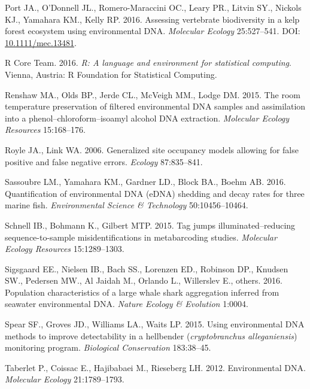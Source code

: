 \documentclass[fleqn,10pt,lineno]{wlpeerj} %
\begin{document}
\hypertarget{ref-MEC:MEC13481}{}
Port JA., O'Donnell JL., Romero-Maraccini OC., Leary PR., Litvin SY.,
Nickols KJ., Yamahara KM., Kelly RP. 2016. Assessing vertebrate
biodiversity in a kelp forest ecosystem using environmental DNA.
\emph{Molecular Ecology} 25:527--541. DOI:
\href{https://doi.org/10.1111/mec.13481}{10.1111/mec.13481}.

\hypertarget{ref-RcoreTeam}{}
R Core Team. 2016. \emph{R: A language and environment for statistical
computing}. Vienna, Austria: R Foundation for Statistical Computing.

\hypertarget{ref-renshaw2015room}{}
Renshaw MA., Olds BP., Jerde CL., McVeigh MM., Lodge DM. 2015. The room
temperature preservation of filtered environmental DNA samples and
assimilation into a phenol--chloroform--isoamyl alcohol DNA extraction.
\emph{Molecular Ecology Resources} 15:168--176.

\hypertarget{ref-royle2006generalized}{}
Royle JA., Link WA. 2006. Generalized site occupancy models allowing for
false positive and false negative errors. \emph{Ecology} 87:835--841.

\hypertarget{ref-sassoubre2016quantification}{}
Sassoubre LM., Yamahara KM., Gardner LD., Block BA., Boehm AB. 2016.
Quantification of environmental DNA (eDNA) shedding and decay rates for
three marine fish. \emph{Environmental Science \& Technology}
50:10456--10464.

\hypertarget{ref-schnell2015tag}{}
Schnell IB., Bohmann K., Gilbert MTP. 2015. Tag jumps
illuminated--reducing sequence-to-sample misidentifications in
metabarcoding studies. \emph{Molecular Ecology Resources} 15:1289--1303.

\hypertarget{ref-sigsgaard2016population}{}
Sigsgaard EE., Nielsen IB., Bach SS., Lorenzen ED., Robinson DP.,
Knudsen SW., Pedersen MW., Al Jaidah M., Orlando L., Willerslev E.,
others. 2016. Population characteristics of a large whale shark
aggregation inferred from seawater environmental DNA. \emph{Nature
Ecology \& Evolution} 1:0004.

\hypertarget{ref-spear2015using}{}
Spear SF., Groves JD., Williams LA., Waits LP. 2015. Using environmental
DNA methods to improve detectability in a hellbender
(\emph{cryptobranchus alleganiensis}) monitoring program.
\emph{Biological Conservation} 183:38--45.

\hypertarget{ref-taberlet2012environmental}{}
Taberlet P., Coissac E., Hajibabaei M., Rieseberg LH. 2012.
Environmental DNA. \emph{Molecular Ecology} 21:1789--1793.
\end{document}
